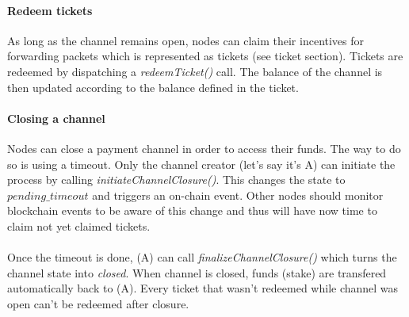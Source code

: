 \paragraph{Redeem tickets}
As long as the channel remains open, nodes can claim their incentives for forwarding packets which is represented as tickets (see ticket section). Tickets are redeemed by dispatching a \textit{redeemTicket()} call. The balance of the channel is then updated according to the balance defined in the ticket.
\paragraph{Closing a channel}
Nodes can close a payment channel in order to access their funds. The way to do so is using a timeout.
Only the channel creator (let's say it's A) can initiate the process by calling \textit{initiateChannelClosure()}. This changes the state to $pending\_timeout$ and triggers an on-chain event. Other nodes should monitor blockchain events to be aware of this change and thus will have now time to claim not yet claimed tickets. 
\\~\\Once the timeout is done, (A) can call \textit{finalizeChannelClosure()} which turns the channel state into \textit{closed}. When channel is closed, funds (stake) are transfered automatically back to (A). Every ticket that wasn't redeemed while channel was open can't be redeemed after closure.

\begin{comment}
    

\begin{figure}[H]
    \centering
    \begin{tikzpicture}[looseness=1,auto]
        \path (0,0) node (closed) [ellipse,draw] {$Closed$};
        \path (-1,-1)  node (commitment) [ellipse,draw,align=left] {$Waiting$\\$Commitment$};
        \path (5,0)  node (open) [ellipse,draw] {$Open$};
        \path (2.5,-1)  node (pending) [ellipse,draw,align=left] {$Pending$\\$Timeout$};

        \draw [->,draw](closed) to [bend left] node {\textsf{fund()}} (commitment);
        \draw [->,draw](commitment) to [bend left] node {\textsf{fund()}} (open);
        \draw [->,draw](open) to [bend left] node [align=center] {\textsf{initiateChannelClosure()}} (pending);
        \draw [->,draw](pending) to [bend left] node {\textsf{finalizeChannelClosure()}} (closed);

        \path[->] (open) edge [out=+120,in=+60,distance=2em,below] node [align=center,above] {\textsf{redeemTicket()}}  (open);
    \end{tikzpicture}
    \label{fig:channel workflow}
    \caption{Channel workflow}
\end{figure}
\end{comment}


